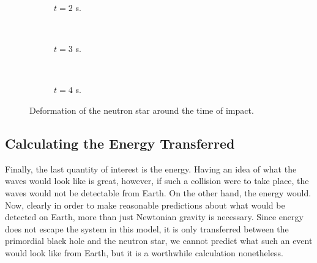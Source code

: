\documentclass[12pt]{article}
\begin{document}
\begin{figure}[p] \ContinuedFloat
\begin{centering}
 \begin{subfigure}{\textwidth}
  
  \caption{$t=2$ s.}
 \end{subfigure} \\
 \begin{subfigure}{\textwidth}
  
  \caption{$t=3$ s.}
 \end{subfigure} \\
  \begin{subfigure}{\textwidth}
  
  \caption{$t=4$ s.}
 \end{subfigure}
 \end{centering}
 \caption{Deformation of the neutron star around the time of impact.}
 \label{fig:eta}
\end{figure}

\subsection{Calculating the Energy Transferred}
\label{chap:energy}

Finally, the last quantity of interest is the energy. Having an idea of what the waves would look like is great, however, if such a collision were to take place, the waves would not be detectable from Earth. On the other hand, the energy would. Now, clearly in order to make reasonable predictions about what would be detected on Earth, more than just Newtonian gravity is necessary. Since energy does not escape the system in this model, it is only transferred between the primordial black hole and the neutron star, we cannot predict what such an event would look like from Earth, but it is a worthwhile calculation nonetheless. \\
\end{document}
